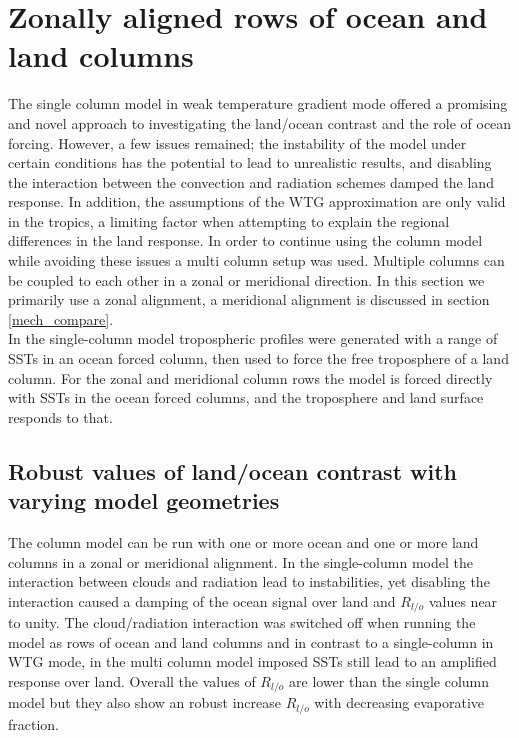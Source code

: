 \clearpage

\section{Zonally aligned rows of ocean and land columns}
\label{mech_mcm}

The single column model in weak temperature gradient mode offered a promising 
and novel approach to investigating the land/ocean contrast and the role of 
ocean forcing.  However, a few issues remained; the instability of the model 
under certain conditions has the potential to lead to unrealistic results, and 
disabling the interaction between the convection and radiation schemes damped  
the land response. In addition, the assumptions of the WTG approximation are 
only valid in the tropics, a limiting factor when attempting to explain the 
regional differences in the land response. In order to continue using the column 
model while avoiding these issues a multi column setup was used. Multiple 
columns can be coupled to each other in a zonal or meridional direction. In this 
section we primarily use a zonal alignment, a meridional alignment is discussed 
in section \ref{mech_compare}.\\
In the single-column model tropospheric profiles were generated with a range of 
SSTs in an ocean forced column, then used to force the free troposphere of a land 
column. For the zonal and meridional column rows the model is forced directly 
with SSTs in the ocean forced columns, and the troposphere and land surface responds to 
that. 

\subsection{Robust values of land/ocean contrast with varying model geometries}

The column model can be run with one or more ocean and one or more land columns 
in a zonal or meridional alignment. In the single-column model the interaction 
between clouds and radiation lead to instabilities, yet disabling the 
interaction caused a damping of the ocean signal over land and $R_{l/o}$ values 
near to unity. The cloud/radiation interaction was switched off when running the 
model as rows of ocean and land columns and in contrast to a single-column in 
WTG mode, in the multi column model imposed SSTs still lead to an amplified 
response over land. Overall the values of $R_{l/o}$ are lower than the single 
column model but they also show an robust increase $R_{l/o}$ with decreasing 
evaporative fraction.   

